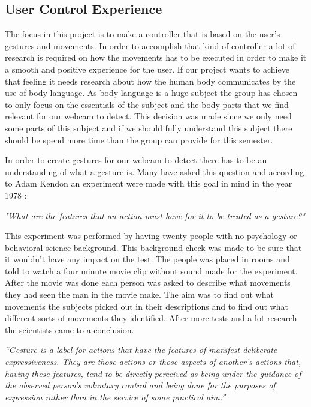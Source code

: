 \subsection{User Control Experience}
The focus in this project is to make a controller that is based on the user’s gestures and movements. In order to accomplish that kind of controller a lot of research is required on how the movements has to be executed in order to make it a smooth and positive experience for the user. If our project wants to achieve that feeling it needs research about how the human body communicates by the use of body language. As body language is a huge subject the group has chosen to only focus on the essentials of the subject and the body parts that we find relevant for our webcam to detect. This decision was made since we only need some parts of this subject and if we should fully understand this subject there should be spend more time than the group can provide for this semester.

In order to create gestures for our webcam to detect there has to be an understanding of what a gesture is. Many have asked this question and according to Adam Kendon an experiment were made with this goal in mind in the year 1978 \parencite{Kendon2004}:
\bigskip

\emph{"What are the features that an action must have for it to be treated as a gesture?"} \parencite{Kendon2004}
\bigskip

This experiment was performed by having twenty people with no psychology or behavioral science background. This background check was made to be sure that it wouldn’t have any impact on the test. The people was placed in rooms and told to watch a four minute movie clip without sound made for the experiment. After the movie was done each person was asked to describe what movements they had seen the man in the movie make. The aim was to find out what movements the subjects picked out in their descriptions and to find out what different sorts of movements they identified. After more tests and a lot research the scientists came to a conclusion.
\bigskip

\emph{“Gesture is a label for actions that have the features of manifest deliberate expressiveness. They are those actions or those aspects of another’s actions that, having these features, tend to be directly perceived as being under the guidance of the observed person’s voluntary control and being done for the purposes of expression rather than in the service of some practical aim.”} \parencite{Kendon2004}
\bigskip

